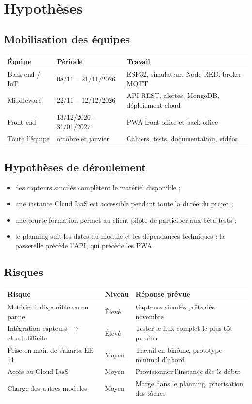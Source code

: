 \documentclass[11pt,a4paper]{article}
\let\oldsection\section
\renewcommand{\section}{\Needspace{10\baselineskip}\oldsection}
\newcommand{\tete}[1]{\textbf{#1}}
\begin{document}
\section{Hypothèses}

\subsection{Mobilisation des équipes}
\begin{tabularx}{\textwidth}{@{}l l L@{}}
\toprule
\tete{Équipe} & \tete{Période} & \tete{Travail} \\
\midrule
Back-end / IoT & 08/11 -- 21/11/2026 & ESP32, simulateur, Node-RED, broker MQTT \\
Middleware & 22/11 -- 12/12/2026 & API REST, alertes, MongoDB, déploiement cloud \\
Front-end & 13/12/2026 -- 31/01/2027 & PWA front-office et back-office \\
Toute l'équipe & octobre et janvier & Cahiers, tests, documentation, vidéos \\
\bottomrule
\end{tabularx}

\subsection{Hypothèses de déroulement}
\begin{itemize}
  \item des capteurs simulés complètent le matériel disponible ;
  \item une instance Cloud IaaS est accessible pendant toute la durée du projet ;
  \item une courte formation permet au client pilote de participer aux bêta-tests ;
  \item le planning suit les dates du module et les dépendances techniques :
        la passerelle précède l'API, qui précède les PWA.
\end{itemize}

\subsection{Risques}
\begin{tabularx}{\textwidth}{@{}L l L@{}}
\toprule
\tete{Risque} & \tete{Niveau} & \tete{Réponse prévue} \\
\midrule
Matériel indisponible ou en panne & Élevé & Capteurs simulés prêts dès novembre \\
Intégration capteurs $\rightarrow$ cloud difficile & Élevé & Tester le flux complet le plus tôt possible \\
Prise en main de Jakarta EE 11 & Moyen & Travail en binôme, prototype minimal d'abord \\
Accès au Cloud IaaS & Moyen & Provisionner l'instance dès le début \\
Charge des autres modules & Moyen & Marge dans le planning, priorisation des tâches \\
\bottomrule
\end{tabularx}
\end{document}
